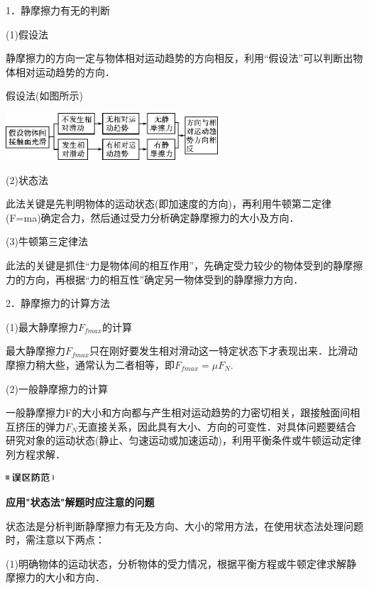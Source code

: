 1．静摩擦力有无的判断

(1)假设法

静摩擦力的方向一定与物体相对运动趋势的方向相反，利用``假设法''可以判断出物体相对运动趋势的方向．

假设法(如图所示)

\begin{center}\includegraphics[width=3.11458in,height=0.6875in]{media/image48.png}\end{center}

(2)状态法

此法关键是先判明物体的运动状态(即加速度的方向)，再利用牛顿第二定律(F=ma)确定合力，然后通过受力分析确定静摩擦力的大小及方向．

(3)牛顿第三定律法

此法的关键是抓住``力是物体间的相互作用''，先确定受力较少的物体受到的静摩擦力的方向，再根据``力的相互性''确定另一物体受到的静摩擦力方向．

2．静摩擦力的计算方法

(1)最大静摩擦力$F_{fmax}$的计算

最大静摩擦力$F_{fmax}$只在刚好要发生相对滑动这一特定状态下才表现出来．比滑动摩擦力稍大些，通常认为二者相等，即$F_{fmax}=\mu F_N$.　

(2)一般静摩擦力的计算

一般静摩擦力F的大小和方向都与产生相对运动趋势的力密切相关，跟接触面间相互挤压的弹力$F_N$无直接关系，因此具有大小、方向的可变性．对具体问题要结合研究对象的运动状态(静止、匀速运动或加速运动)，利用平衡条件或牛顿运动定律列方程求解．



\begin{center}\includegraphics[width=0.70833in,height=0.125in]{media/image34.png}\end{center}
\begin{center}
	\textbf{应用"状态法"解题时应注意的问题}
\end{center}

状态法是分析判断静摩擦力有无及方向、大小的常用方法，在使用状态法处理问题时，需注意以下两点：

(1)明确物体的运动状态，分析物体的受力情况，根据平衡方程或牛顿定律求解静摩擦力的大小和方向．

